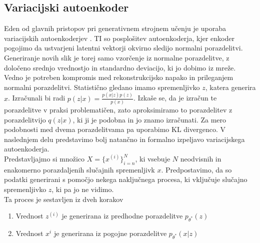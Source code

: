 \documentclass[12pt,a4paper,twoside]{article}
\theoremstyle{definition} %
\theoremstyle{plain} %
\numberwithin{equation}{section}  %
\begin{document}
\subsection{Variacijski autoenkoder}
Eden od glavnih pristopov pri generativnem strojnem učenju je uporaba variacijskih autoenkoderjev \cite{kingma2013auto}.  TI so posplošitev autoenkoderja, kjer  enkoder pogojimo da ustvarjeni latentni vektorji okvirno sledijo normalni porazdelitvi. Generiranje novih slik je torej samo vzorčenje iz  normalne porazdelitve,
z določeno srednjo vrednostjo in standardno deviacijo, ki jo dobimo iz mreže. Vedno je potreben kompromis med rekonstrukcijsko napako in prileganjem normalni porazdelitvi. 
Statistično gledano imamo spremenljivko $z$, katera generira $x$. Izračunali bi radi $p(z|x) = \frac{p(x|z)p(z)}{p(x)}$. Izkaše se, da je izračun te porazdelitve v praksi problematičen, zato aproksimiramo to porazdelitev z porazdelitvijo $q(z|x)$, ki ji je podobna in jo znamo izračunati. Za mero podobnosti med dvema porazdelitvama pa uporabimo KL divergenco. 
V naslednjem delu predstavimo bolj natančno in formalno izpeljavo variacijskega autoenkoderja. 
 \\
Predstavljajmo si množico $ X = \{x^{(i)}\}_{i=n}^N$, ki vsebuje $N$ neodvisnih in enakomerno porazdaljenih slučajnih spremenljivk $x$. Predpostavimo, da so podatki generirani s pomočjo nekega naključnega procesa, ki vključuje slučajno spremenljivko $z$, ki pa jo ne vidimo. \\
Ta proces je sestavljen iz dveh korakov 
\begin{enumerate}
\item Vrednost $z^{(i)}$ je generirana iz predhodne porazdelitve $p_{\theta^*}(z)$
\item Vrednost $x^{i}$ je generirana iz pogojne porazdelitve $p_{\theta^*}(x|z)$
\end{enumerate}
\end{document}
